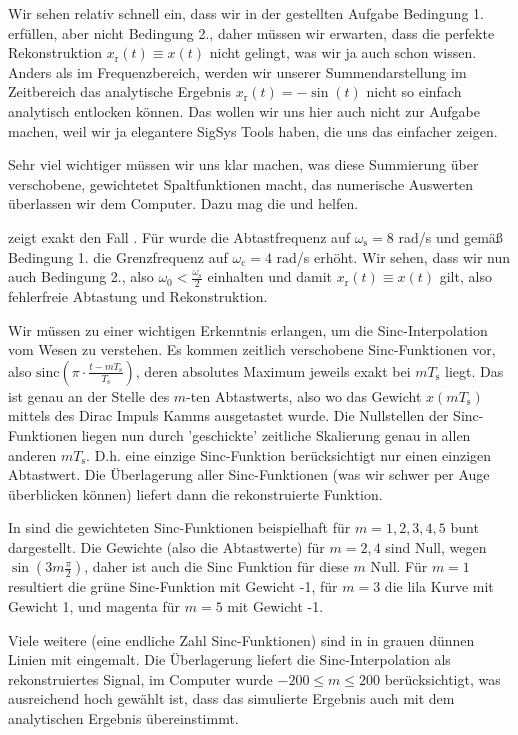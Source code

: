 \begin{Loesung}
Wir sehen relativ schnell ein, dass wir in der gestellten Aufgabe Bedingung 1.
erfüllen, aber nicht Bedingung 2., daher müssen wir erwarten, dass die perfekte
Rekonstruktion $x_\mathrm{r}(t) \equiv x(t)$ nicht gelingt,
was wir ja auch schon wissen.
%
Anders als im Frequenzbereich, werden wir unserer Summendarstellung
 im Zeitbereich das analytische Ergebnis
$x_\mathrm{r}(t)=-\sin(t)$ nicht so einfach analytisch entlocken können.
Das wollen wir uns hier auch nicht zur Aufgabe machen, weil wir ja elegantere
SigSys Tools haben, die uns das einfacher zeigen.
%

Sehr viel wichtiger müssen wir uns klar machen, was diese Summierung über
verschobene, gewichtetet Spaltfunktionen macht, das numerische Auswerten
überlassen wir dem Computer. Dazu mag die
und
helfen.


 zeigt exakt den Fall
.
%
Für  wurde die Abtastfrequenz
auf $\omega_\mathrm{s}=8$ rad/s und gemäß Bedingung 1. die Grenzfrequenz
auf $\omega_\mathrm{c}=4$ rad/s erhöht. Wir sehen, dass wir nun auch Bedingung
2., also $\omega_0 < \frac{\omega_\mathrm{s}}{2}$ einhalten und damit
$x_\mathrm{r}(t) \equiv x(t)$ gilt, also fehlerfreie Abtastung und Rekonstruktion.

Wir müssen zu einer wichtigen Erkenntnis erlangen, um die Sinc-Interpolation
vom Wesen zu verstehen.
Es kommen zeitlich verschobene Sinc-Funktionen vor,
also $\mathrm{sinc}\left(\pi \cdot \frac{t-m T_\mathrm{s}}{T_\mathrm{s}}\right)$,
deren absolutes Maximum jeweils exakt bei $m T_\mathrm{s}$ liegt. Das ist
genau an der Stelle des $m$-ten Abtastwerts, also wo das Gewicht
$x(m T_\mathrm{s})$ mittels des Dirac Impuls Kamms ausgetastet wurde.
Die Nullstellen der Sinc-Funktionen liegen
nun durch 'geschickte' zeitliche Skalierung genau in allen anderen
$m T_\mathrm{s}$. D.h.
eine einzige Sinc-Funktion berücksichtigt nur einen einzigen Abtastwert.
Die Überlagerung aller Sinc-Funktionen (was wir schwer per Auge überblicken können)
liefert dann die rekonstruierte Funktion.

In  sind die gewichteten Sinc-Funktionen
beispielhaft
für $m=1,2,3,4,5$ bunt dargestellt. Die Gewichte (also die Abtastwerte) für $m=2,4$
sind Null, wegen $\sin(3 m \frac{\pi}{2})$, daher ist auch die Sinc Funktion für diese
$m$ Null. Für $m=1$ resultiert die grüne Sinc-Funktion mit Gewicht -1, für $m=3$
die lila Kurve mit Gewicht 1, und magenta für $m=5$ mit Gewicht -1.

Viele weitere (eine endliche Zahl Sinc-Funktionen) sind in in grauen dünnen Linien
mit eingemalt. Die Überlagerung liefert die Sinc-Interpolation als rekonstruiertes
Signal, im Computer wurde $-200\leq m\leq 200$ berücksichtigt,
was ausreichend hoch gewählt ist,
dass das simulierte Ergebnis auch mit dem analytischen Ergebnis übereinstimmt.

\end{Loesung}
